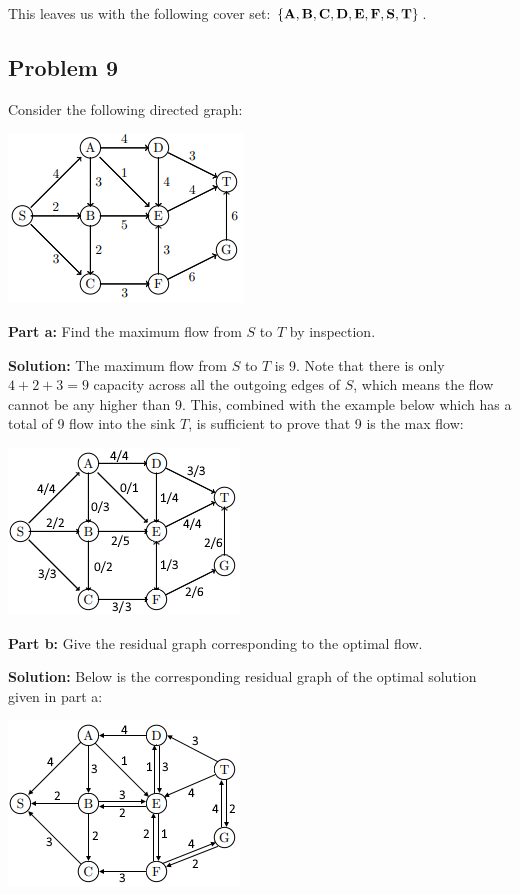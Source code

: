 \documentclass{article}
\begin{document}
This leaves us with the following cover set: $\bf{\{A,B,C,D,E,F,S,T\}}$.

\subsection*{Problem 9}
Consider the following directed graph:
\begin{center}
  \includegraphics{graph9.png}
\end{center}
\medskip

\noindent\textbf{Part a:} Find the maximum flow from $S$ to $T$ by inspection.
\bigskip

\noindent\textbf{Solution:} The maximum flow from $S$ to $T$ is 9. Note that there is only $4+2+3=9$ capacity across all the outgoing edges of $S$, which means the flow cannot be any higher than 9. This, combined with the example below which has a total of 9 flow into the sink $T$, is sufficient to prove that 9 is the max flow:
\begin{center}
  \includegraphics{graph9a.png}
\end{center}
\medskip

\noindent\textbf{Part b:} Give the residual graph corresponding to the optimal flow.
\bigskip

\noindent\textbf{Solution:} Below is the corresponding residual graph of the optimal solution given in part a:
\begin{center}
  \includegraphics{graph9b.png}
\end{center}
\medskip
\end{document}
